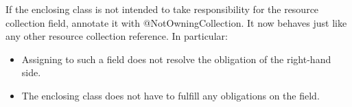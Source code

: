 If the enclosing class is not intended to take responsibility for the resource collection field, annotate it with @NotOwningCollection. It now behaves just like any other resource collection reference. In particular:

\begin{itemize}
  \item Assigning to such a field does not resolve the obligation of the right-hand side.
  \item The enclosing class does not have to fulfill any obligations on the field.
\end{itemize}







